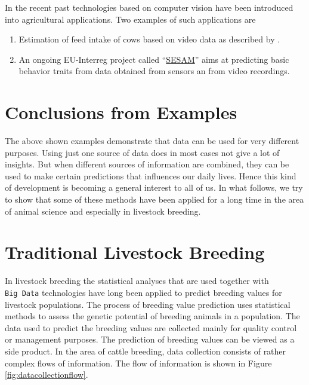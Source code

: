\documentclass[
]{book}
\providecommand{\tightlist}{%
  \setlength{\itemsep}{0pt}\setlength{\parskip}{0pt}}
\theoremstyle{definition}
\theoremstyle{definition}
\theoremstyle{definition}
\theoremstyle{remark}
\begin{document}
In the recent past technologies based on computer vision have been introduced into agricultural applications. Two examples of such applications are

\begin{enumerate}
\def\labelenumi{\arabic{enumi}.}
\tightlist
\item
  Estimation of feed intake of cows based on video data as described by \citep{Chizzotti2015}.
\item
  An ongoing EU-Interreg project called ``\href{https://www.alpine-space.eu/projects/sesam/en/home}{SESAM}'' aims at predicting basic behavior traits from data obtained from sensors an from video recordings.
\end{enumerate}

\hypertarget{conclusions-from-examples}{%
\section{Conclusions from Examples}\label{conclusions-from-examples}}

The above shown examples demonstrate that data can be used for very different purposes. Using just one source of data does in most cases not give a lot of insights. But when different sources of information are combined, they can be used to make certain predictions that influences our daily lives. Hence this kind of development is becoming a general interest to all of us. In what follows, we try to show that some of these methods have been applied for a long time in the area of animal science and especially in livestock breeding.

\hypertarget{asm-traditional-animal-breeding}{%
\section{Traditional Livestock Breeding}\label{asm-traditional-animal-breeding}}

In livestock breeding the statistical analyses that are used together with \texttt{Big\ Data} technologies have long been applied to predict breeding values for livestock populations. The process of breeding value prediction uses statistical methods to assess the genetic potential of breeding animals in a population. The data used to predict the breeding values are collected mainly for quality control or management purposes. The prediction of breeding values can be viewed as a side product. In the area of cattle breeding, data collection consists of rather complex flows of information. The flow of information is shown in Figure \ref{fig:datacollectionflow}.
\end{document}
